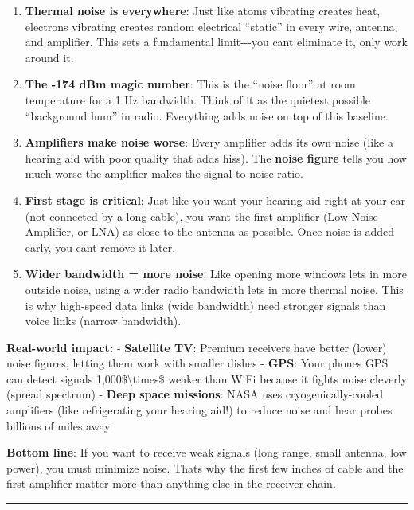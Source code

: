\begin{enumerate}
\def\labelenumi{\arabic{enumi}.}
\item
  \textbf{Thermal noise is everywhere}: Just like atoms vibrating
  creates heat, electrons vibrating creates random electrical ``static''
  in every wire, antenna, and amplifier. This sets a fundamental
  limit-\/-\/-you can\textquotesingle t eliminate it, only work around
  it.
\item
  \textbf{The -174 dBm magic number}: This is the ``noise floor'' at
  room temperature for a 1 Hz bandwidth. Think of it as the quietest
  possible ``background hum'' in radio. Everything adds noise on top of
  this baseline.
\item
  \textbf{Amplifiers make noise worse}: Every amplifier adds its own
  noise (like a hearing aid with poor quality that adds hiss). The
  \textbf{noise figure} tells you how much worse the amplifier makes the
  signal-to-noise ratio.
\item
  \textbf{First stage is critical}: Just like you want your hearing aid
  right at your ear (not connected by a long cable), you want the first
  amplifier (Low-Noise Amplifier, or LNA) as close to the antenna as
  possible. Once noise is added early, you can\textquotesingle t remove
  it later.
\item
  \textbf{Wider bandwidth = more noise}: Like opening more windows lets
  in more outside noise, using a wider radio bandwidth lets in more
  thermal noise. This is why high-speed data links (wide bandwidth) need
  stronger signals than voice links (narrow bandwidth).
\end{enumerate}

\textbf{Real-world impact:} - \textbf{Satellite TV}: Premium receivers
have better (lower) noise figures, letting them work with smaller dishes
- \textbf{GPS}: Your phone\textquotesingle s GPS can detect signals
1,000\$\textbackslash times\$ weaker than WiFi because it fights noise
cleverly (spread spectrum) - \textbf{Deep space missions}: NASA uses
cryogenically-cooled amplifiers (like refrigerating your hearing aid!)
to reduce noise and hear probes billions of miles away

\textbf{Bottom line}: If you want to receive weak signals (long range,
small antenna, low power), you must minimize noise.
That\textquotesingle s why the first few inches of cable and the first
amplifier matter more than anything else in the receiver chain.

\begin{center}\rule{0.5\linewidth}{0.5pt}\end{center}

